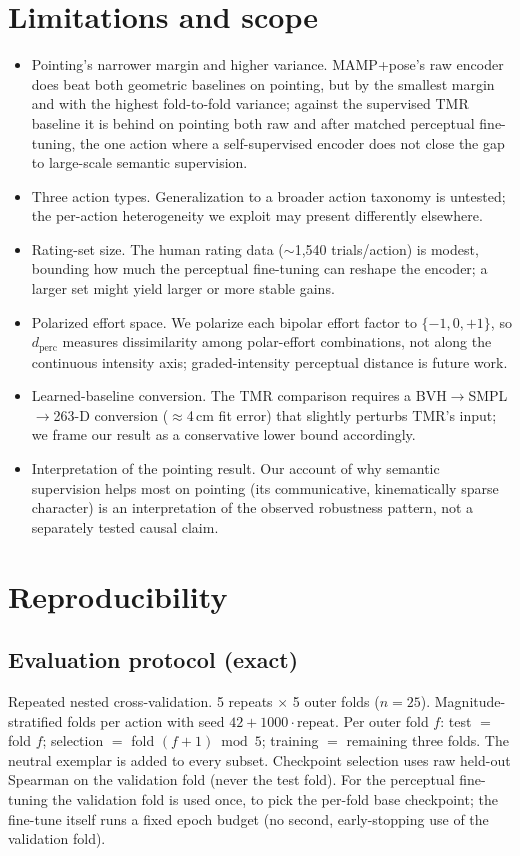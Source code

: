 \documentclass[letterpaper]{article} %
\begin{document}
\section{Limitations and scope}
\begin{itemize}
\item {Pointing's narrower margin and higher variance.} MAMP+pose's raw encoder does beat
both geometric baselines on pointing, but by the smallest margin and with the highest fold-to-fold
variance; against the supervised TMR baseline it is behind on pointing both raw and after matched
perceptual fine-tuning, the one action where a self-supervised encoder does not close the gap to
large-scale semantic supervision.
\item {Three action types.} Generalization to a broader action taxonomy is untested; the
per-action heterogeneity we exploit may present differently elsewhere.
\item {Rating-set size.} The human rating data ($\sim$1{,}540 trials/action) is modest,
bounding how much the perceptual fine-tuning can reshape the encoder; a larger set might yield
larger or more stable gains.
\item {Polarized effort space.} We polarize each bipolar effort factor to $\{-1,0,+1\}$, so
$d_{\text{perc}}$ measures dissimilarity among polar-effort combinations, not along the continuous
intensity axis; graded-intensity perceptual distance is future work.
\item {Learned-baseline conversion.} The TMR comparison requires a BVH$\to$SMPL$\to$263-D
conversion ($\approx$4\,cm fit error) that slightly perturbs TMR's input; we frame our result as a
conservative lower bound accordingly.
\item {Interpretation of the pointing result.} Our account of why semantic supervision helps most
on pointing (its communicative, kinematically sparse character) is an interpretation of the observed
robustness pattern, not a separately tested causal claim.
\end{itemize}

\section{Reproducibility}

\subsection{Evaluation protocol (exact)}
{Repeated nested cross-validation.} 5 repeats $\times$ 5 outer folds ($n=25$).
Magnitude-stratified folds per action with seed $42 + 1000\cdot\text{repeat}$. Per outer fold $f$:
test $=$ fold $f$; selection $=$ fold $(f{+}1)\bmod 5$; training $=$ remaining three folds. The
neutral exemplar is added to every subset. Checkpoint selection uses raw held-out Spearman on the
validation fold (never the test fold). For the perceptual fine-tuning the validation fold is used
{once}, to pick the per-fold base checkpoint; the fine-tune itself runs a {fixed epoch
budget} (no second, early-stopping use of the validation fold).
\end{document}
